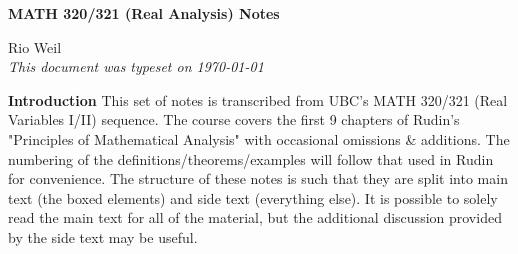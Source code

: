 \documentclass[10pt]{article}
\begin{document}
\begin{tcolorbox}
  \begin{center}
  \begin{Large}
    \textbf{MATH 320/321 (Real Analysis) Notes} \\
    \vspace{5pt}
  \end{Large}
  \begin{large}
        Rio Weil \\
\vspace{5pt}
    \emph{This document was typeset on \today}
  \end{large}
  \end{center}
\end{tcolorbox}

\begin{center}
  \textbf{Introduction}
  This set of notes is transcribed from UBC's MATH 320/321 (Real Variables I/II) sequence. The course covers the first 9 chapters of Rudin's "Principles of Mathematical Analysis" with occasional omissions \& additions. The numbering of the definitions/theorems/examples will follow that used in Rudin for convenience. The structure of these notes is such that they are split into main text (the boxed elements) and side text (everything else). It is possible to solely read the main text for all of the material, but the additional discussion provided by the side text may be useful.
\end{center}
\tableofcontents

\newpage










\end{document}

